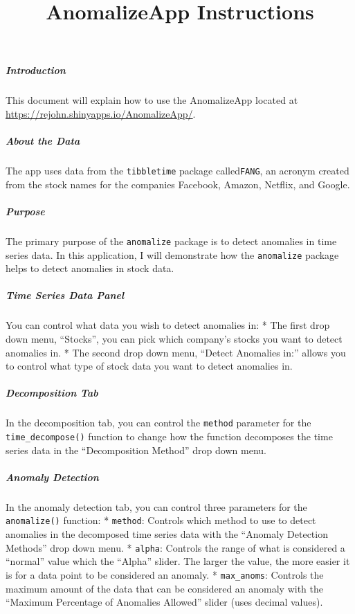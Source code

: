 \documentclass[]{article}
\title{AnomalizeApp Instructions}
\author{}
\date{}
\let\oldsubparagraph\subparagraph
\renewcommand{\subparagraph}[1]{\oldsubparagraph{#1}\mbox{}}
\begin{document}
\maketitle

\subparagraph{Introduction}\label{introduction}

This document will explain how to use the AnomalizeApp located at
\url{https://rejohn.shinyapps.io/AnomalizeApp/}.

\subparagraph{About the Data}\label{about-the-data}

The app uses data from the \texttt{tibbletime} package
called\texttt{FANG}, an acronym created from the stock names for the
companies Facebook, Amazon, Netflix, and Google.

\subparagraph{Purpose}\label{purpose}

The primary purpose of the \texttt{anomalize} package is to detect
anomalies in time series data. In this application, I will demonstrate
how the \texttt{anomalize} package helps to detect anomalies in stock
data.

\subparagraph{Time Series Data Panel}\label{time-series-data-panel}

You can control what data you wish to detect anomalies in: * The first
drop down menu, ``Stocks'', you can pick which company's stocks you want
to detect anomalies in. * The second drop down menu, ``Detect Anomalies
in:'' allows you to control what type of stock data you want to detect
anomalies in.

\subparagraph{Decomposition Tab}\label{decomposition-tab}

In the decomposition tab, you can control the \texttt{method} parameter
for the \texttt{time\_decompose()} function to change how the function
decomposes the time series data in the ``Decomposition Method'' drop
down menu.

\subparagraph{Anomaly Detection}\label{anomaly-detection}

In the anomaly detection tab, you can control three parameters for the
\texttt{anomalize()} function: * \texttt{method}: Controls which method
to use to detect anomalies in the decomposed time series data with the
``Anomaly Detection Methods'' drop down menu. * \texttt{alpha}: Controls
the range of what is considered a ``normal'' value which the ``Alpha''
slider. The larger the value, the more easier it is for a data point to
be considered an anomaly. * \texttt{max\_anoms}: Controls the maximum
amount of the data that can be considered an anomaly with the ``Maximum
Percentage of Anomalies Allowed'' slider (uses decimal values).
\end{document}
